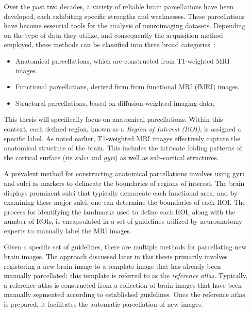 Over the past two decades, a variety of reliable brain parcellations have been
developed, each exhibiting specific strengths and weaknesses. These
parcellations have become essential tools for the analysis of neuroimaging
datasets. Depending on the type of data they utilize, and consequently the
acquisition method employed, these methods can be classified into three broad
categories~:
\begin{itemize}
    \item Anatomical parcellations, which are constructed from T1-weighted MRI
    images.
    \item Functional parcellations, derived from from functional MRI (fMRI)
    images.
    \item Structural parcellations, based on diffusion-weighted-imaging
    data.
\end{itemize}
This thesis will specifically focus on anatomical parcellations. Within this
context, each defined region, known as a \emph{Region of Interest (ROI)}, is
assigned a specific label. As noted earlier, T1-weighted MRI images effectively
capture the anatomical structure of the brain. This includes the intricate
folding patterns of the cortical surface (its \emph{sulci} and
\emph{gyri}) as well as sub-cortical structures.

A prevalent method for constructing anatomical parcellations involves using gyri
and sulci as markers to delineate the boundaries of regions of interest. The
brain displays prominent sulci that typically demarcate each functional area,
and by examining these major sulci, one can determine the boundaries of each
ROI. The process for identifying the landmarks used to define each ROI, along
with the number of ROIs, is encapsulated in a set of guidelines utilized by
neuroanatomy experts to manually label the MRI images. 

Given a specific set of guidelines, there are multiple methods for parcellating
new brain images. The approach discussed later in this thesis primarily involves
registering a new brain image to a template image that has already been manually
parcellated; this template is referred to as the \emph{reference atlas}.
Typically, a reference atlas is constructed from a collection of brain images
that have been manually segmented according to established guidelines. Once the
reference atlas is prepared, it facilitates the automatic parcellation of new
images.

